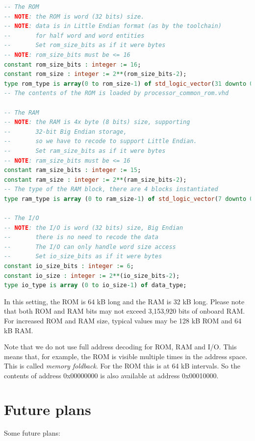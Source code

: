 \documentclass[12pt]{article}
\begin{document}
\begin{lstlisting}[language=VHDL]
-- The ROM
-- NOTE: the ROM is word (32 bits) size.
-- NOTE: data is in Little Endian format (as by the toolchain)
--       for half word and word entities
--       Set rom_size_bits as if it were bytes
-- NOTE: rom_size_bits must be <= 16
constant rom_size_bits : integer := 16;
constant rom_size : integer := 2**(rom_size_bits-2);
type rom_type is array(0 to rom_size-1) of std_logic_vector(31 downto 0);
-- The contents of the ROM is loaded by processor_common_rom.vhd

-- The RAM
-- NOTE: the RAM is 4x byte (8 bits) size, supporting
--       32-bit Big Endian storage,
--       so we have to recode to support Little Endian.
--       Set ram_size_bits as if it were bytes
-- NOTE: ram_size_bits must be <= 16
constant ram_size_bits : integer := 15;
constant ram_size : integer := 2**(ram_size_bits-2);
-- The type of the RAM block, there are 4 blocks instantiated
type ram_type is array (0 to ram_size-1) of std_logic_vector(7 downto 0);
                    
-- The I/O
-- NOTE: the I/O is word (32 bits) size, Big Endian
--       there is no need to recode the data
--       The I/O can only handle word size access
--       Set io_size_bits as if it were bytes
constant io_size_bits : integer := 6;
constant io_size : integer := 2**(io_size_bits-2);
type io_type is array (0 to io_size-1) of data_type;
\end{lstlisting}

In this setting, the ROM is 64 kB long and the RAM is 32 kB long. Please note that both ROM and RAM bits may not exceed 3,153,920 bits of onboard RAM. For increased ROM and RAM size, typical values may be 128 kB ROM and 64 kB RAM.

Note that we do not use full address decoding for ROM, RAM and I/O. This means that, for example, the ROM is visible multiple times in the address space. This is called \emph{memory foldback}. For the ROM this is at 64 kB intervals. So the contents of address 0x00000000 is also available at address 0x00010000.

\section{Future plans}
Some future plans:
\end{document}
